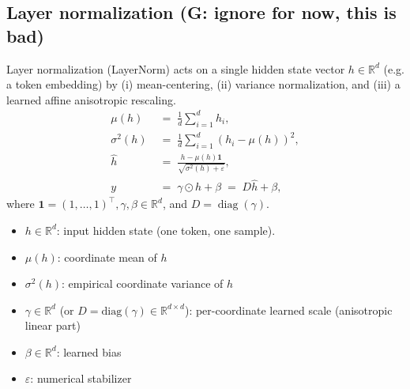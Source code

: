 \documentclass[a4paper,12pt]{article}
\begin{document}
\subsection{Layer normalization (G: ignore for now, this is bad)}\label{subsec:layer_norm}%
Layer normalization (LayerNorm) acts on a single hidden state vector \(h\in\mathbb{R}^d\) (e.g. a token embedding) by (i) mean-centering, (ii) variance normalization, and (iii) a learned affine anisotropic rescaling.
\begin{align}
\mu(h) &\;=\; \frac{1}{d}\sum_{i=1}^d h_i, \\
\sigma^2(h) &\;=\; \frac{1}{d}\sum_{i=1}^d (h_i-\mu(h))^2, \\
\widehat{h} &\;=\; \frac{h - \mu(h)\mathbf{1}}{\sqrt{\sigma^2(h)+\varepsilon}}, \label{eq:ln_norm}\\
y &\;=\; \gamma \odot \widehat{h} + \beta \;=\; D\widehat{h} + \beta, \label{eq:ln_affine}
\end{align}
where \(\mathbf{1}=(1,\dots,1)^\top , \gamma, \beta \in\mathbb{R}^d\), and \(D=\operatorname{diag}(\gamma)\).


\begin{itemize}
  \item \(h\in\mathbb{R}^d\): input hidden state (one token, one sample).
  \item \(\mu(h)\): coordinate mean of \(h\)
  \item \(\sigma^2(h)\): empirical coordinate variance of \(h\)
  \item \(\gamma\in\mathbb{R}^d\) (or \(D=\mathrm{diag}(\gamma)\in\mathbb{R}^{d\times d}\)): per-coordinate learned scale (anisotropic linear part)
  \item \(\beta\in\mathbb{R}^d\): learned bias
  \item \(\varepsilon\): numerical stabilizer
\end{itemize}
\end{document}
